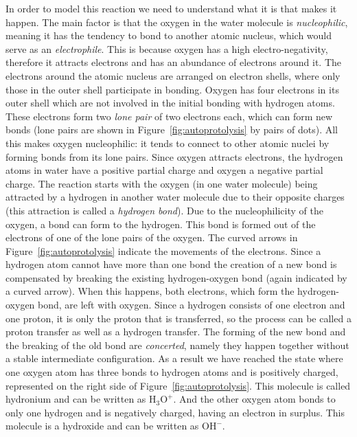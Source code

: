 \documentclass[runningheads]{llncs}
\begin{document}
In order to model this reaction we need to understand what it is that makes it happen.
The main factor is that the oxygen in the water molecule is \emph{nucleophilic}, meaning it has the tendency to bond to another atomic nucleus, which would serve as an \emph{electrophile}. This is because oxygen has a high 
electro-negativity, therefore it attracts electrons and has an abundance of electrons around it. The electrons around the atomic nucleus are arranged on electron shells, where only those in the outer shell participate in bonding. Oxygen has four electrons in its outer shell which are not involved in the initial bonding with hydrogen atoms. These electrons form two \emph{lone pair} of two electrons each, which can form new bonds (lone pairs are shown in Figure~\ref{fig:autoprotolysis} by pairs of dots). All this makes oxygen nucleophilic: it tends to connect 
to other atomic nuclei by forming bonds from its lone pairs. Since oxygen attracts electrons, the hydrogen atoms in water
have a positive partial charge and oxygen a negative partial charge. The reaction
starts with the oxygen (in one water molecule) being attracted by a hydrogen in another 
water molecule due to their opposite
charges (this attraction is called a \emph{hydrogen bond}). Due to the nucleophilicity of 
the oxygen, a bond can form to the hydrogen. This bond is formed out of 
the electrons of one of the lone pairs of the oxygen. The curved arrows in Figure~\ref{fig:autoprotolysis} indicate the movements of the electrons. Since a hydrogen atom cannot have more 
than one bond 
the creation of a new bond is compensated by breaking the existing hydrogen-oxygen bond (again indicated by a curved arrow). When this happens, both electrons, which form the hydrogen-oxygen bond, are left with oxygen. Since a hydrogen consists of one electron and one proton, it is only the proton that is transferred, so the process can be called a proton transfer as well as a hydrogen transfer. The forming of the new bond and the breaking of the old bond are \emph{concerted}, namely they happen together without a stable 
intermediate configuration. As a result we have reached the state where one oxygen atom
has three bonds to hydrogen atoms and is positively charged, represented on the right side of Figure~\ref{fig:autoprotolysis}. This molecule is called hydronium and can be written as $\mathrm{H_3O^+}$. And the other oxygen atom bonds to only one hydrogen and is negatively charged, having an 
electron in surplus. This molecule is a hydroxide and can be written as $\mathrm{OH^-}$. 
\end{document}

